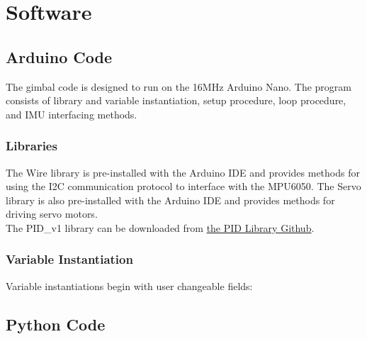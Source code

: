 \documentclass[11pt]{article} %
\begin{document}
\newpage
\section{Software}



\subsection{Arduino Code}
The gimbal code is designed to run on the 16MHz Arduino Nano. The program consists of library and variable instantiation, setup procedure, loop procedure, and IMU interfacing methods.

\subsubsection{Libraries}
The Wire library is pre-installed with the Arduino IDE and provides methods for using the I2C communication protocol to interface with the MPU6050. The Servo library is also pre-installed with the Arduino IDE and provides methods for driving servo motors. \\

The PID\_v1 library can be downloaded from \href{https://github.com/br3ttb/Arduino-PID-Library}{the PID Library Github}.\\



\subsubsection{Variable Instantiation}
Variable instantiations begin with user changeable fields:


\subsection{Python Code}
\end{document}
